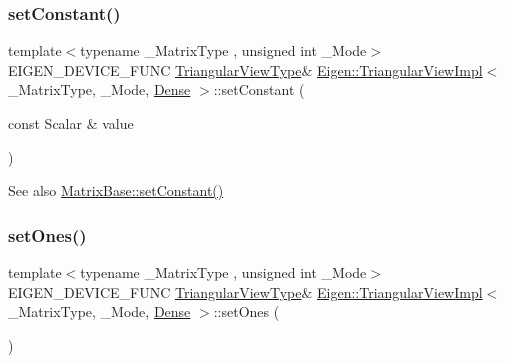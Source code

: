 \subsubsection{\texorpdfstring{setConstant()}{setConstant()}}
{\footnotesize\ttfamily template$<$typename \+\_\+\+Matrix\+Type , unsigned int \+\_\+\+Mode$>$ \\
E\+I\+G\+E\+N\+\_\+\+D\+E\+V\+I\+C\+E\+\_\+\+F\+U\+NC \mbox{\hyperlink{class_eigen_1_1_triangular_view}{Triangular\+View\+Type}}\& \mbox{\hyperlink{class_eigen_1_1_triangular_view_impl}{Eigen\+::\+Triangular\+View\+Impl}}$<$ \+\_\+\+Matrix\+Type, \+\_\+\+Mode, \mbox{\hyperlink{struct_eigen_1_1_dense}{Dense}} $>$\+::set\+Constant (\begin{DoxyParamCaption}\item[{const Scalar \&}]{value }\end{DoxyParamCaption})\hspace{0.3cm}{\ttfamily [inline]}}

\begin{DoxySeeAlso}{See also}
\mbox{\hyperlink{class_eigen_1_1_dense_base_a19b2bc788277e9ab3f967a8857e290ae}{Matrix\+Base\+::set\+Constant()}} 
\end{DoxySeeAlso}
\mbox{\label{class_eigen_1_1_triangular_view_impl_3_01___matrix_type_00_01___mode_00_01_dense_01_4_a39d202f5efbf14179ca30435c9dc04b5}} 
\subsubsection{\texorpdfstring{setOnes()}{setOnes()}}
{\footnotesize\ttfamily template$<$typename \+\_\+\+Matrix\+Type , unsigned int \+\_\+\+Mode$>$ \\
E\+I\+G\+E\+N\+\_\+\+D\+E\+V\+I\+C\+E\+\_\+\+F\+U\+NC \mbox{\hyperlink{class_eigen_1_1_triangular_view}{Triangular\+View\+Type}}\& \mbox{\hyperlink{class_eigen_1_1_triangular_view_impl}{Eigen\+::\+Triangular\+View\+Impl}}$<$ \+\_\+\+Matrix\+Type, \+\_\+\+Mode, \mbox{\hyperlink{struct_eigen_1_1_dense}{Dense}} $>$\+::set\+Ones (\begin{DoxyParamCaption}{ }\end{DoxyParamCaption})\hspace{0.3cm}{\ttfamily [inline]}}

